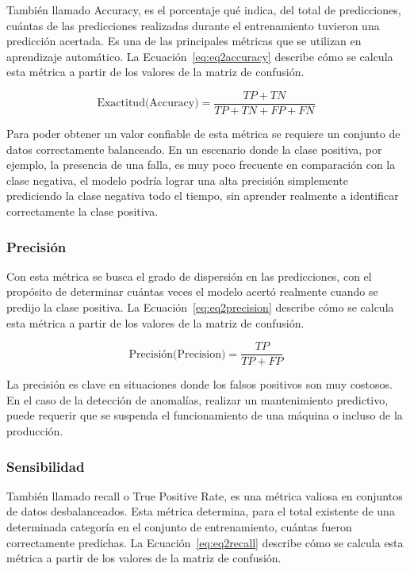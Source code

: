 \documentclass[11pt,a4paper,spanish]{book}
\numberwithin{equation}{chapter}
\numberwithin{figure}{chapter}
\begin{document}
También llamado Accuracy, es el porcentaje qué indica, del total de predicciones, 
cuántas de las predicciones realizadas durante el entrenamiento tuvieron una predicción 
acertada. Es una de las principales métricas que se utilizan en aprendizaje automático. 
La Ecuación~\eqref{eq:eq2accuracy} describe cómo se calcula esta métrica a partir de 
los valores de la matriz de confusión. 

\begin{equation}\label{eq:eq2accuracy}
\text{Exactitud(Accuracy)} = \frac{TP + TN}{TP + TN + FP + FN}
\end{equation}

Para poder obtener un valor confiable de esta métrica se requiere un conjunto de datos 
correctamente balanceado.  En un escenario donde la clase positiva, por ejemplo, la 
presencia de una falla, es muy poco frecuente en comparación con la clase negativa, el 
modelo podría lograr una alta precisión simplemente prediciendo la clase negativa todo 
el tiempo, sin aprender realmente a identificar correctamente la clase positiva.

\subsubsection{Precisión}

Con esta métrica se busca el grado de dispersión en las predicciones, con el propósito 
de determinar cuántas veces el modelo acertó realmente cuando se predijo la clase 
positiva. La Ecuación~\eqref{eq:eq2precision} describe cómo se calcula esta métrica a 
partir de los valores de la matriz de confusión. 

\begin{equation}\label{eq:eq2precision}
\text{Precisión(Precision)} = \frac{TP}{TP + FP}
\end{equation}

La precisión es clave en situaciones donde los falsos positivos son muy costosos. En el 
caso de la detección de anomalías, realizar un mantenimiento predictivo, puede requerir 
que se suspenda el funcionamiento de una máquina o incluso de la producción. 


\subsubsection{Sensibilidad}

También llamado recall o True Positive Rate, es una métrica valiosa en conjuntos de 
datos desbalanceados. Esta métrica determina, para el total existente de una determinada 
categoría en el conjunto de entrenamiento, cuántas fueron correctamente predichas. La 
Ecuación~\eqref{eq:eq2recall} describe cómo se calcula esta métrica a partir de los 
valores de la matriz de confusión. 
\end{document}
